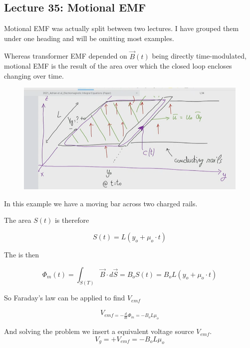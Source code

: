 \documentclass[10pt]{article}
\begin{document}
\subsection{Lecture 35: Motional EMF}
\begin{blockquote}
	Motional EMF was actually split between two lectures. I have grouped them under one heading and will be omitting most examples.
\end{blockquote}

Whereas transformer EMF depended on $ \vec{B}(t)$ being directly time-modulated, motional EMF is the result of the area over which the closed loop encloses changing over time.

\begin{figure}[H]
	\centering
	\includegraphics[width=0.8\linewidth]{img/image_2022-04-18-18-14-42.png}
\end{figure}

In this example we have a moving bar across two charged rails.

The area $ S(t) $ is therefore

\begin{equation}
	S(t) = L(y_o + \mu_o \cdot  t)
\end{equation}

The is then 

\begin{equation}
	\Phi_m(t) = \int_{S(T)} \vec{B} \cdot  d \vec{S} = B_o S(t) = B_o L (y_o + \mu_o \cdot  t)
\end{equation}

So Faraday's law can be applied to find $ V_{emf} $ 


\begin{equation}
	V_{emf = - \frac{d}{dt} \Phi_m = - B_o L \mu_o}
\end{equation}

And solving the problem we insert a equivalent voltage source $ V_{emf} $.
\begin{equation}
	V_g = + V_{emf} = - B_o L \mu_o
\end{equation}
\end{document}
